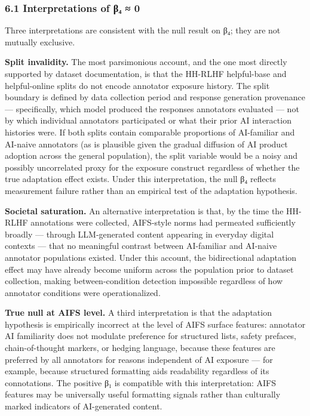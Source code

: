 
\subsubsection{6.1 Interpretations of β₄ ≈ 0}

Three interpretations are consistent with the null result on β₄; they are not mutually exclusive.

\textbf{Split invalidity.} The most parsimonious account, and the one most directly supported by dataset documentation, is that the HH-RLHF helpful-base and helpful-online splits do not encode annotator exposure history. The split boundary is defined by data collection period and response generation provenance — specifically, which model produced the responses annotators evaluated — not by which individual annotators participated or what their prior AI interaction histories were. If both splits contain comparable proportions of AI-familiar and AI-naive annotators (as is plausible given the gradual diffusion of AI product adoption across the general population), the split variable would be a noisy and possibly uncorrelated proxy for the exposure construct regardless of whether the true adaptation effect exists. Under this interpretation, the null β₄ reflects measurement failure rather than an empirical test of the adaptation hypothesis.

\textbf{Societal saturation.} An alternative interpretation is that, by the time the HH-RLHF annotations were collected, AIFS-style norms had permeated sufficiently broadly — through LLM-generated content appearing in everyday digital contexts — that no meaningful contrast between AI-familiar and AI-naive annotator populations existed. Under this account, the bidirectional adaptation effect may have already become uniform across the population prior to dataset collection, making between-condition detection impossible regardless of how annotator conditions were operationalized.

\textbf{True null at AIFS level.} A third interpretation is that the adaptation hypothesis is empirically incorrect at the level of AIFS surface features: annotator AI familiarity does not modulate preference for structured lists, safety prefaces, chain-of-thought markers, or hedging language, because these features are preferred by all annotators for reasons independent of AI exposure — for example, because structured formatting aids readability regardless of its connotations. The positive β₁ is compatible with this interpretation: AIFS features may be universally useful formatting signals rather than culturally marked indicators of AI-generated content.

